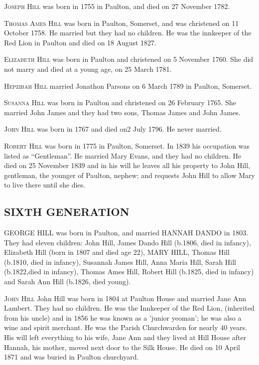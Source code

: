 \textsc{Joseph Hill} was born in 1755 in Paulton, and died on 27 November 1782.

\textsc{Thomas Ames Hill} was born in Paulton, Somerset, and was christened on 11 October 1758. He married  but they had no children. He was the innkeeper of the Red Lion in Paulton and died on 18 August 1827.

\textsc{Elizabeth Hill} was born in Paulton and christened on 5 November 1760. She did not marry and died at a young age, on  25 March 1781.

\textsc{Hepzibah Hill} married Jonathon Parsons on 6 March 1789 in Paulton, Somerset.

\textsc{Susanna Hill} was born in Paulton and christened on 26 February 1765. She married John James and they had two sons, Thomas James and John James.

\textsc{John Hill} was born in 1767 and died on2 July 1796. He never married.

\textsc{Robert Hill} was born in 1775 in Paulton, Somerset. In 1839 his occupation was listed as ``Gentleman''. He married Mary Evans, and they had no children. He died on 25 November 1839 and in his will he leaves all his property to John Hill, gentleman, the younger of Paulton, nephew; and requests John Hill to allow Mary to live there until she dies.

\subsection{SIXTH GENERATION}

\uppercase{George Hill} was born in Paulton, and married \uppercase{Hannah Dando} in 1803. They had eleven children: John Hill, James Dando Hill (b.1806, died in infancy), Elizabeth Hill (born in 1807 and died age 22), \uppercase{Mary Hill}, Thomas Hill (b.1810, died in infancy), Susannah James Hill, Anna Maria Hill, Sarah Hill (b.1822,died in infancy), Thomas Ames Hill, Robert Hill (b.1825, died in infancy) and Sarah Ann Hill (b.1826, died young). 

\textsc{John Hill} John Hill was born in 1804 at Paulton House and married Jane Ann Lambert. They had no children. He was the Innkeeper of the Red Lion, (inherited from his uncle) and in 1856 he was known as a 'junior yeoman'; he was also a wine and spirit merchant. He was the Parish Churchwarden for nearly 40 years. His will left everything to his wife, Jane Ann and they lived at Hill House after Hannah, his mother, moved next door to the Silk House. He died on 10 April 1871 and was buried in Paulton churchyard.

